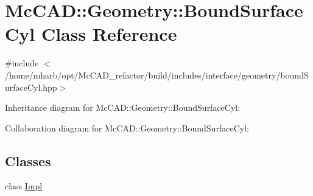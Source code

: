 \hypertarget{classMcCAD_1_1Geometry_1_1BoundSurfaceCyl}{}\section{Mc\+C\+AD\+:\+:Geometry\+:\+:Bound\+Surface\+Cyl Class Reference}
\label{classMcCAD_1_1Geometry_1_1BoundSurfaceCyl}


{\ttfamily \#include $<$/home/mharb/opt/\+Mc\+C\+A\+D\+\_\+refactor/build/includes/interface/geometry/bound\+Surface\+Cyl.\+hpp$>$}



Inheritance diagram for Mc\+C\+AD\+:\+:Geometry\+:\+:Bound\+Surface\+Cyl\+:


Collaboration diagram for Mc\+C\+AD\+:\+:Geometry\+:\+:Bound\+Surface\+Cyl\+:
\subsection*{Classes}
\begin{DoxyCompactItemize}
\item 
class \hyperlink{classMcCAD_1_1Geometry_1_1BoundSurfaceCyl_1_1Impl}{Impl}
\end{DoxyCompactItemize}
